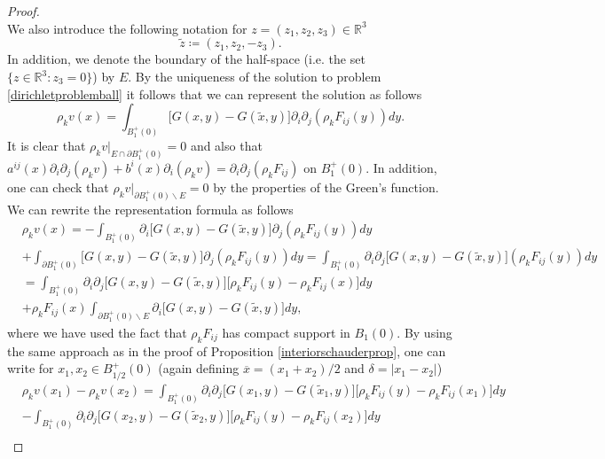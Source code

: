 \documentclass[12pt,a4paper]{article}
\theoremstyle{definition}
\theoremstyle{remark}
\numberwithin{equation}{section}
\begin{document}
\begin{appendices}
\begin{proof}
\begin{equation*}
\end{equation*}
We also introduce the following notation for $z = (z_1, z_2, z_3) \in \mathbb{R}^3$
\begin{equation*}
\widetilde{z} \coloneqq (z_1, z_2, - z_3).
\end{equation*}
In addition, we denote the boundary of the half-space (i.e. the set $\{ z \in \mathbb{R}^3 : z_3 = 0 \}$) by $E$.
By the uniqueness of the solution to problem \eqref{dirichletproblemball} it follows that we can represent the solution as follows
\begin{equation}
\rho_k v (x) = \int_{B_1^+ (0)} \bigg[ G(x,y) - G(\widetilde{x},y) \bigg] \partial_i \partial_j (\rho_k  F_{ij} (y)) dy.
\end{equation}
It is clear that $\rho_k v \lvert_{E \cap \partial B_1^+ (0)} = 0$ and also that $a^{ij} (x) \partial_i  \partial_j (\rho_k v) + b^i (x) \partial_i (\rho_k v) = \partial_i \partial_j (\rho_k  F_{ij})$ on $B_1^+ (0)$. In addition, one can check that $\rho_k v \lvert_{\partial B_1^+ (0) \backslash E} = 0$ by the properties of the Green's function. We can rewrite the representation formula as follows
\begin{align*}
&\rho_k v (x) = - \int_{B_1^+ (0)} \partial_i \bigg[ G(x,y) - G(\widetilde{x},y) \bigg] \partial_j (\rho_k  F_{ij} (y)) dy \\
&+ \int_{\partial B_1^+ (0)} \bigg[ G(x,y) - G(\widetilde{x},y) \bigg] \partial_j (\rho_k  F_{ij} (y)) dy = \int_{B_1^+ (0)} \partial_i \partial_j \bigg[ G(x,y) - G(\widetilde{x},y) \bigg] (\rho_k  F_{ij} (y)) dy \\
&= \int_{B_1^+ (0)} \partial_i \partial_j \bigg[ G(x,y) - G(\widetilde{x},y) \bigg] \big[ \rho_k  F_{ij} (y) - \rho_k  F_{ij} (x) \big] dy \\
&+ \rho_k  F_{ij} (x) \int_{\partial B_1^+ (0) \backslash E} \partial_i \bigg[ G(x,y) - G(\widetilde{x},y) \bigg] dy,
\end{align*}
where we have used the fact that $\rho_k F_{ij}$ has compact support in $B_1 (0)$. By using the same approach as in the proof of Proposition \ref{interiorschauderprop}, one can write for $x_1, x_2 \in B_{1/2}^+ (0)$ (again defining $\overline{x} = (x_1 + x_2) / 2$ and $\delta = \lvert x_1 - x_2 \rvert$)
\begin{align*}
&\rho_k v (x_1) - \rho_k v (x_2) = \int_{B_1^+ (0)} \partial_i \partial_j \bigg[ G(x_1,y) - G(\widetilde{x}_1,y) \bigg] \big[ \rho_k  F_{ij} (y) - \rho_k  F_{ij} (x_1) \big] dy \\
&- \int_{B_1^+ (0)} \partial_i \partial_j \bigg[ G(x_2,y) - G(\widetilde{x}_2,y) \bigg] \big[ \rho_k  F_{ij} (y) - \rho_k  F_{ij} (x_2) \big] dy \\

\end{align*}
\end{proof}
\end{appendices}
\end{document}
